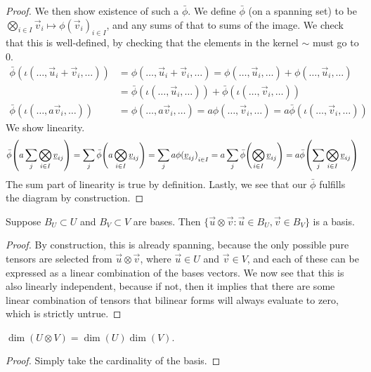 \begin{proof}
    We then show existence of such a \(\bar{\phi}\).
    We define \(\bar{\phi}\) (on a spanning set) to be
    \(\bigotimes_{i \in I} \vec{v}_i \mapsto \phi{(\vec{v}_i)}_{i \in I}\),
    and any sums of that to sums of the image.
    We check that this is well-defined,
    by checking that the elements in the kernel \(\sim\) must go to 0.
    \begin{align*}
        \bar{\phi}(\iota(\hdots,\vec{u}_i+\vec{v}_i,\hdots))
        &= \phi(\hdots,\vec{u}_i+\vec{v}_i,\hdots)
        = \phi(\hdots,\vec{u}_i,\hdots) + \phi(\hdots,\vec{u}_i,\hdots) \\
        &= \bar{\phi}(\iota(\hdots,\vec{u}_i,\hdots))
        + \bar{\phi}(\iota(\hdots,\vec{v}_i,\hdots)) \\
        \bar{\phi}(\iota(\hdots,a\vec{v}_i,\hdots))
        &= \phi(\hdots,a\vec{v}_i,\hdots)
        = a\phi(\hdots,\vec{v}_i,\hdots)
        = a\bar{\phi}(\iota(\hdots,\vec{v}_i,\hdots))
    \end{align*}
    We show linearity.
    \begin{equation*}
        \bar{\phi}\pqty{a\sum_j \bigotimes_{i \in I} \vec{v}_{ij}}
        = \sum_j \bar{\phi}\pqty{a\bigotimes_{i \in I} \vec{v}_{ij}}
        = \sum_j a\phi{(\vec{v}_{ij})}_{i \in I}
        = a \sum_j \bar{\phi}\pqty{\bigotimes_{i \in I} \vec{v}_{ij}}
        = a \bar{\phi}\pqty{\sum_j \bigotimes_{i \in I} \vec{v}_{ij}}
    \end{equation*}
    The sum part of linearity is true by definition.
    Lastly, we see that our \(\bar{\phi}\) fulfills the diagram by construction.
\end{proof}

\begin{proposition}\label{prop:tensor-basis}
    Suppose \(B_U \subset U\) and \(B_V \subset V\) are bases.
    Then \(\{\vec{u}\otimes\vec{v}: \vec{u} \in B_U, \vec{v} \in B_V\}\) is a basis.
\end{proposition}
\begin{proof}
    By construction, this is already spanning,
    because the only possible pure tensors are selected from \(\vec{u}\otimes\vec{v}\),
    where \(\vec{u} \in U\) and \(\vec{v} \in V\),
    and each of these can be expressed as a linear combination of the bases vectors.
    We now see that this is also linearly independent,
    because if not,
    then it implies that there are some linear combination of tensors
    that bilinear forms will always evaluate to zero,
    which is strictly untrue.
\end{proof}
\begin{corollary}\label{cor:dim-tensor-product}
    \(\dim(U \otimes V) = \dim(U)\dim(V)\).
\end{corollary}
\begin{proof}
    Simply take the cardinality of the basis.
\end{proof}

